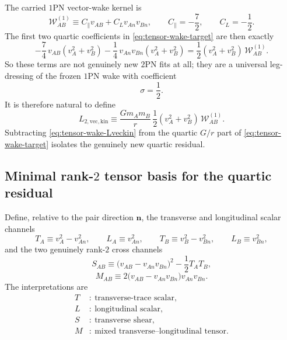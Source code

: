 \documentclass[11pt]{article}
\newcommand{\OnePN}{\mathrm{1PN}}
\newcommand{\TwoPN}{\mathrm{2PN}}
\begin{document}
The carried \(\OnePN\) vector-wake kernel is
\begin{equation}
\mathcal W^{(1)}_{AB}
\equiv
C_{\parallel}v_{AB}+C_Lv_{An}v_{Bn},
\qquad
C_{\parallel}=-\frac72,
\qquad
C_L=-\frac12.
\label{eq:tensor-wake-1pn-kernel}
\end{equation}
The first two quartic coefficients in \cref{eq:tensor-wake-target} are then exactly
\begin{equation}
-\frac74\,v_{AB}(v_A^2+v_B^2)
-\frac14\,v_{An}v_{Bn}(v_A^2+v_B^2)
=
\frac12(v_A^2+v_B^2)\,\mathcal W^{(1)}_{AB}.
\label{eq:tensor-wake-leg-dressing}
\end{equation}
So these terms are not genuinely new \(\TwoPN\) fits at all; they are a universal
leg-dressing of the frozen \(\OnePN\) wake with coefficient
\begin{equation}
\sigma=\frac12.
\label{eq:tensor-wake-sigma}
\end{equation}
It is therefore natural to define
\begin{equation}
L_{2,\mathrm{vec,kin}}
\equiv
\frac{Gm_A m_B}{r}\,\frac12(v_A^2+v_B^2)\,\mathcal W^{(1)}_{AB}.
\label{eq:tensor-wake-Lveckin}
\end{equation}
Subtracting \cref{eq:tensor-wake-Lveckin} from the quartic \(G/r\) part of
\cref{eq:tensor-wake-target} isolates the genuinely new quartic residual.

\subsection{Minimal rank-\texorpdfstring{$2$}{2} tensor basis for the quartic residual}
\label{app:tensor-wake-rank2}

Define, relative to the pair direction \(\mathbf n\), the transverse and longitudinal
scalar channels
\begin{equation}
T_A\equiv v_A^2-v_{An}^2,
\qquad
L_A\equiv v_{An}^2,
\qquad
T_B\equiv v_B^2-v_{Bn}^2,
\qquad
L_B\equiv v_{Bn}^2,
\label{eq:tensor-wake-TL}
\end{equation}
and the two genuinely rank-\(2\) cross channels
\begin{equation}
S_{AB}
\equiv
\bigl(v_{AB}-v_{An}v_{Bn}\bigr)^2-\frac12 T_A T_B,
\label{eq:tensor-wake-S}
\end{equation}
\begin{equation}
M_{AB}
\equiv
2\bigl(v_{AB}-v_{An}v_{Bn}\bigr)v_{An}v_{Bn}.
\label{eq:tensor-wake-M}
\end{equation}
The interpretations are
\begin{equation}
\begin{aligned}
T&:\ \text{transverse-trace scalar},\\
L&:\ \text{longitudinal scalar},\\
S&:\ \text{transverse shear},\\
M&:\ \text{mixed transverse--longitudinal tensor}.
\end{aligned}
\label{eq:tensor-wake-channel-meanings}
\end{equation}
\end{document}
